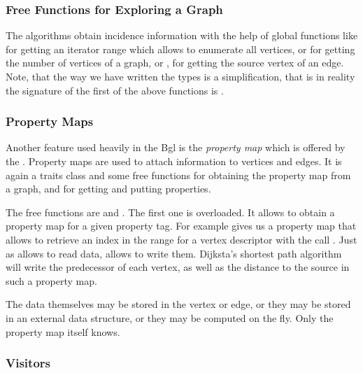 \subsubsection*{Free Functions for Exploring a Graph}

The algorithms obtain incidence information with the help of global
functions like  for getting an iterator range which allows
to enumerate all vertices, or  for getting the number of vertices of a graph, or
, for
getting the source vertex of an edge. Note, that the
way we have written the types is a simplification, that is in reality
the signature of the first of the above functions is 
.

\subsubsection*{Property Maps}

Another feature used heavily in the {\sc Bgl} is the {\em property map}
which is offered by the .
Property maps are used to attach information to vertices and edges. It is again
a traits class and some free functions for obtaining the property map from
a graph, and  for getting and putting properties. 

The free functions are  and .  The first one is overloaded.
It allows to obtain a property map for a given property tag. For example
 gives us a property map that allows to retrieve
an index in the range  \ccc{[0, num_vertices(g))} for a vertex descriptor 
with the call .  Just as  allows to read data,
 allows to write them.  Dijksta's shortest path algorithm will write
the predecessor of each vertex, as well as the distance to the source in such a 
property map.


The data themselves may be stored in the vertex or edge, or they may
be stored in an external data structure, or they may be computed on
the fly. Only the property map itself knows.



\subsubsection*{Visitors}

